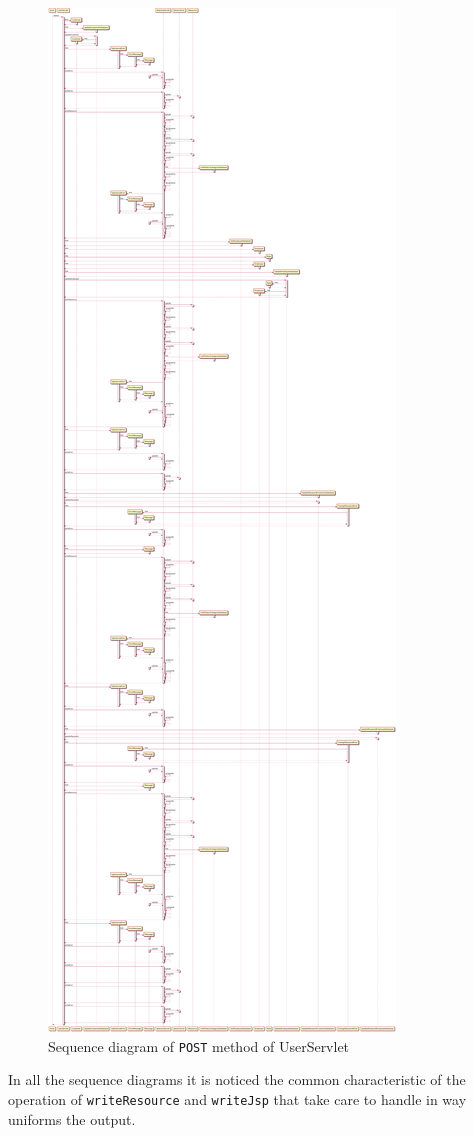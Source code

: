 \begin{figure}[H]
    \centering
    \includegraphics[width=\textwidth,height=0.95\textheight,keepaspectratio]{Schemas/UserServlet_doPost.svg.pdf}
    \caption{Sequence diagram of \texttt{POST} method of UserServlet}
    \label{fig:UserServlet_doPost}
\end{figure}

In all the sequence diagrams it is noticed the common characteristic
of the operation of \texttt{writeResource} and \texttt{writeJsp} 
that take care to handle in way uniforms the output.
